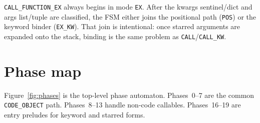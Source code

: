 \documentclass[11pt,a4paper]{article}
\begin{document}
\texttt{CALL\_FUNCTION\_EX} always begins in mode \texttt{EX}.
After the kwargs sentinel/dict and args list/tuple are classified, the FSM either
joins the positional path (\texttt{POS}) or the keyword binder (\texttt{EX\_KW}).
That join is intentional: once starred arguments are expanded onto the stack,
binding is the same problem as \texttt{CALL}/\texttt{CALL\_KW}.

\section{Phase map}

Figure~\ref{fig:phases} is the top-level phase automaton.
Phases~0--7 are the common \texttt{CODE\_OBJECT} path.
Phases~8--13 handle non-code callables.
Phases~16--19 are entry preludes for keyword and starred forms.
\end{document}
